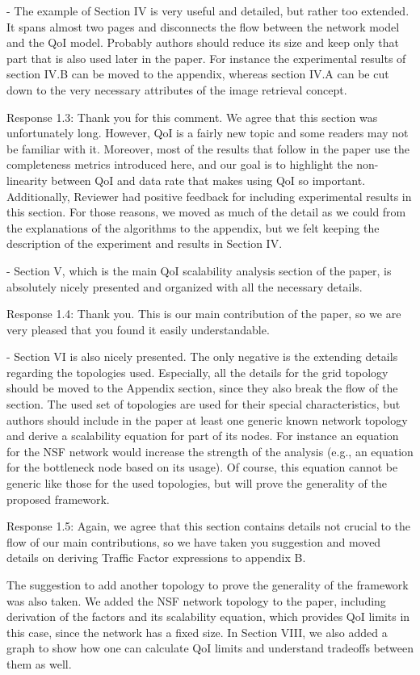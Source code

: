 \documentclass[12pt, letterpaper, onecolumn]{IEEEtran}
\begin{document}
- The example of Section IV is very useful and detailed, but rather too extended. It spans almost two pages and disconnects the flow between the network model and the QoI model. Probably authors should reduce its size and keep only that part that is also used later in the paper. For instance the experimental results of section IV.B can be moved to the appendix, whereas section IV.A can be cut down to the very necessary attributes of the image retrieval concept.

{\color {blue}
Response 1.3: Thank you for this comment. We agree that this section was unfortunately long. However, QoI is a fairly new topic and some readers may not be familiar with it. Moreover, most of the results that follow in the paper use the completeness metrics introduced here, and our goal is to highlight the non-linearity between QoI and data rate that makes using QoI so important. Additionally, Reviewer had positive feedback for including experimental results in this section. For those reasons, we moved as much of the detail as we could from the explanations of the algorithms to the appendix, but we felt keeping the description of the experiment and results in Section IV. 
}

- Section V, which is the main QoI scalability analysis section of the paper, is absolutely nicely presented and organized with all the necessary details.

{\color {blue}Response 1.4: Thank you. This is our main contribution of the paper, so we are very pleased that you found it easily understandable.}

- Section VI is also nicely presented. The only negative is the extending details regarding the topologies used. Especially, all the details for the grid topology should be moved to the Appendix section, since they also break the flow of the section. The used set of topologies are used for their special characteristics, but authors should include in the paper at least one generic known network topology and derive a scalability equation for part of its nodes. For instance an equation for the NSF network would increase the strength of the analysis (e.g., an equation for the bottleneck node based on its usage). Of course, this equation cannot be generic like those for the used topologies, but will prove the generality of the proposed framework.

{\color {blue}
Response 1.5: Again, we agree that this section contains details not crucial to the flow of our main contributions, so we have taken you suggestion and moved details on deriving Traffic Factor expressions to appendix B. 

The suggestion to add another topology to prove the generality of the framework was also taken. We added the NSF network topology to the paper, including derivation of the factors and its scalability equation, which provides QoI limits in this case, since the network has a fixed size. In Section VIII, we also added a graph to show how one can calculate QoI limits and understand tradeoffs between them as well.  
}
\end{document}
